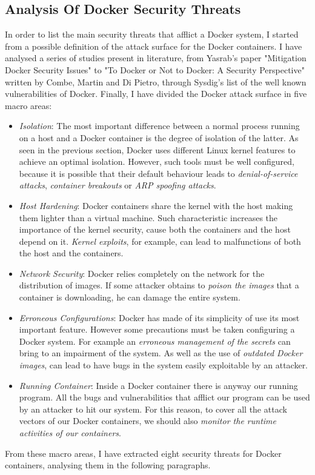 \documentclass[a4paper,12pt]{article}
\begin{document}
\subsection{Analysis Of Docker Security Threats}

In order to list the main security threats that afflict a Docker system, I
started from a possible definition of the attack surface for the Docker
containers. I have analysed a series of studies present in literature, from
Yasrab's paper "Mitigation Docker Security
Issues"\cite{mitigating_docker_security_issues_yasrab} to  "To Docker or Not to
Docker: A Security Perspective" written by Combe, Martin and Di
Pietro\cite{to_docker_or_not_to_docker}, through Sysdig's list of the well known
vulnerabilities of Docker\cite{sysdig_docker_vulnerabilities}. Finally, I have
divided the Docker attack surface in five macro areas:
\begin{itemize}
  \item \textit{Isolation}: The most important difference between a normal
  process running on a host and a Docker container is the degree of isolation of
  the latter. As seen in the previous section, Docker uses different Linux
  kernel features to achieve an optimal isolation. However, such tools must be
  well configured, because it is possible that their default behaviour leads to
  \textit{denial-of-service attacks}, \textit{container breakouts} or
  \textit{ARP spoofing attacks}.
  \item \textit{Host Hardening}: Docker containers share the kernel with the
  host making them lighter than a virtual machine. Such characteristic
  increases the importance of the kernel security, cause both the containers and
  the host depend on it. \textit{Kernel exploits}, for example, can lead to
  malfunctions of both the host and the containers. 
  \item \textit{Network Security}: Docker relies completely on the network for
  the distribution of images. If some attacker obtains to \textit{poison the
  images} that a container is downloading, he can damage the entire system.
  \item \textit{Erroneous Configurations}: Docker has made of its simplicity of
  use its most important feature. However some precautions must be taken
  configuring a Docker system. For example an \textit{erroneous management of
  the secrets} can bring to an impairment of the system. As well as the use of
  \textit{outdated Docker images}, can lead to have bugs in the system easily
  exploitable by an attacker.
  \item \textit{Running Container}: Inside a Docker container there is anyway
  our running program. All the bugs and vulnerabilities that afflict our program
  can be used by an attacker to hit our system. For this reason, to cover all the
  attack vectors of our Docker containers, we should also \textit{monitor the
  runtime activities of our containers}.
\end{itemize}
From these macro areas, I have extracted eight security threats for Docker
containers, analysing them in the following paragraphs.
 
\end{document}
